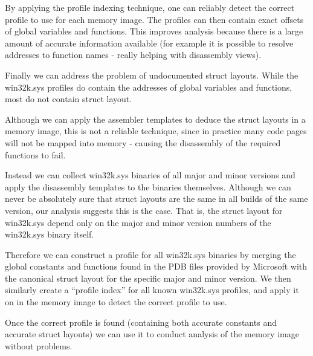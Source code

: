 By applying the profile indexing technique, one can reliably detect the correct
profile to use for each memory image. The profiles can then contain exact
offsets of global variables and functions. This improves analysis because there
is a large amount of accurate information available (for example it is possible
to resolve addresses to function names - really helping with disassembly views).

Finally we can address the problem of undocumented struct layouts. While the
win32k.sys profiles do contain the addresses of global variables and functions,
most do not contain struct layout.

Although we can apply the assembler templates to deduce the struct layouts in a
memory image, this is not a reliable technique, since in practice many code
pages will not be mapped into memory - causing the disassembly of the required
functions to fail.

Instead we can collect win32k.sys binaries of all major and minor versions and
apply the disassembly templates to the binaries themselves. Although we can
never be absolutely sure that struct layouts are the same in all builds of the
same version, our analysis suggests this is the case. That is, the struct layout
for win32k.sys depend only on the major and minor version numbers of the
win32k.sys binary itself.

Therefore we can construct a profile for all win32k.sys binaries by merging the
global constants and functions found in the PDB files provided by Microsoft with
the canonical struct layout for the specific major and minor version. We then
similarly create a ``profile index'' for all known win32k.sys profiles, and
apply it on in the memory image to detect the correct profile to use.

Once the correct profile is found (containing both accurate constants and
accurate struct layouts) we can use it to conduct analysis of the memory image
without problems.


